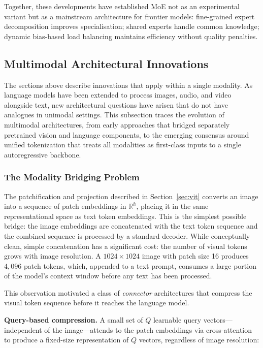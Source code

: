 \documentclass{book}
\begin{document}
Together, these developments have established MoE not as an experimental
variant but as a mainstream architecture for frontier models: fine-grained
expert decomposition improves specialisation; shared experts handle common
knowledge; dynamic bias-based load balancing maintains efficiency without
quality penalties.

\subsection{Multimodal Architectural Innovations}

The sections above describe innovations that apply within a single modality.
As language models have been extended to process images, audio, and video
alongside text, new architectural questions have arisen that do not have
analogues in unimodal settings. This subsection traces the evolution of
multimodal architectures, from early approaches that bridged separately
pretrained vision and language components, to the emerging consensus around
unified tokenization that treats all modalities as first-class inputs to a
single autoregressive backbone.

\subsubsection*{The Modality Bridging Problem}

The patchification and projection described in Section~\ref{sec:vit} converts
an image into a sequence of patch embeddings in $\mathbb{R}^h$, placing it in
the same representational space as text token embeddings. This is the
simplest possible bridge: the image embeddings are concatenated with the text
token sequence and the combined sequence is processed by a standard decoder.
While conceptually clean, simple concatenation has a significant cost: the
number of visual tokens grows with image resolution. A $1024 \times 1024$
image with patch size 16 produces $4{,}096$ patch tokens, which, appended to
a text prompt, consumes a large portion of the model's context window before
any text has been processed.

This observation motivated a class of \emph{connector} architectures that
compress the visual token sequence before it reaches the language model.

\textbf{Query-based compression.} A small set of $Q$ learnable query
vectors---independent of the image---attends to the patch embeddings via
cross-attention to produce a fixed-size representation of $Q$ vectors,
regardless of image resolution:
\end{document}
